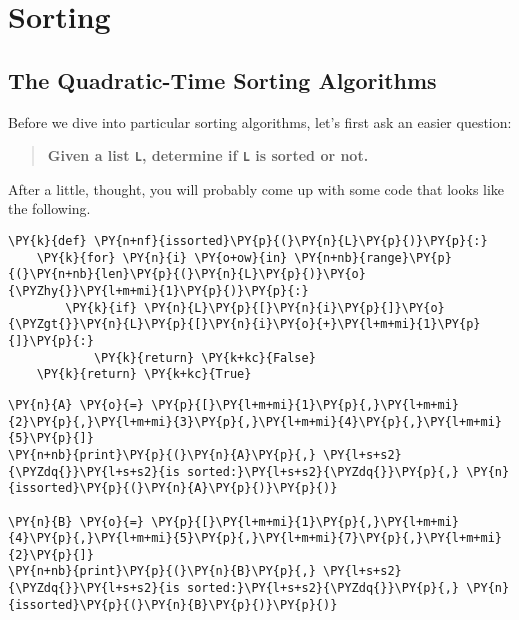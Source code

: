 \chapter{Sorting}

\section{The Quadratic-Time Sorting Algorithms}


Before we dive into particular sorting algorithms, let's first ask an easier question:

\begin{quote}

\textbf{Given a list \texttt{L}, determine if \texttt{L} is sorted or not.}

\end{quote}

After a little, thought, you will probably come up with some code that looks like the following.

\begin{Verbatim}[commandchars=\\\{\}]
\PY{k}{def} \PY{n+nf}{issorted}\PY{p}{(}\PY{n}{L}\PY{p}{)}\PY{p}{:}
    \PY{k}{for} \PY{n}{i} \PY{o+ow}{in} \PY{n+nb}{range}\PY{p}{(}\PY{n+nb}{len}\PY{p}{(}\PY{n}{L}\PY{p}{)}\PY{o}{\PYZhy{}}\PY{l+m+mi}{1}\PY{p}{)}\PY{p}{:}
        \PY{k}{if} \PY{n}{L}\PY{p}{[}\PY{n}{i}\PY{p}{]}\PY{o}{\PYZgt{}}\PY{n}{L}\PY{p}{[}\PY{n}{i}\PY{o}{+}\PY{l+m+mi}{1}\PY{p}{]}\PY{p}{:}
            \PY{k}{return} \PY{k+kc}{False}
    \PY{k}{return} \PY{k+kc}{True}
\end{Verbatim}



\begin{Verbatim}[commandchars=\\\{\}]
\PY{n}{A} \PY{o}{=} \PY{p}{[}\PY{l+m+mi}{1}\PY{p}{,}\PY{l+m+mi}{2}\PY{p}{,}\PY{l+m+mi}{3}\PY{p}{,}\PY{l+m+mi}{4}\PY{p}{,}\PY{l+m+mi}{5}\PY{p}{]}
\PY{n+nb}{print}\PY{p}{(}\PY{n}{A}\PY{p}{,} \PY{l+s+s2}{\PYZdq{}}\PY{l+s+s2}{is sorted:}\PY{l+s+s2}{\PYZdq{}}\PY{p}{,} \PY{n}{issorted}\PY{p}{(}\PY{n}{A}\PY{p}{)}\PY{p}{)}

\PY{n}{B} \PY{o}{=} \PY{p}{[}\PY{l+m+mi}{1}\PY{p}{,}\PY{l+m+mi}{4}\PY{p}{,}\PY{l+m+mi}{5}\PY{p}{,}\PY{l+m+mi}{7}\PY{p}{,}\PY{l+m+mi}{2}\PY{p}{]}
\PY{n+nb}{print}\PY{p}{(}\PY{n}{B}\PY{p}{,} \PY{l+s+s2}{\PYZdq{}}\PY{l+s+s2}{is sorted:}\PY{l+s+s2}{\PYZdq{}}\PY{p}{,} \PY{n}{issorted}\PY{p}{(}\PY{n}{B}\PY{p}{)}\PY{p}{)}
\end{Verbatim}

